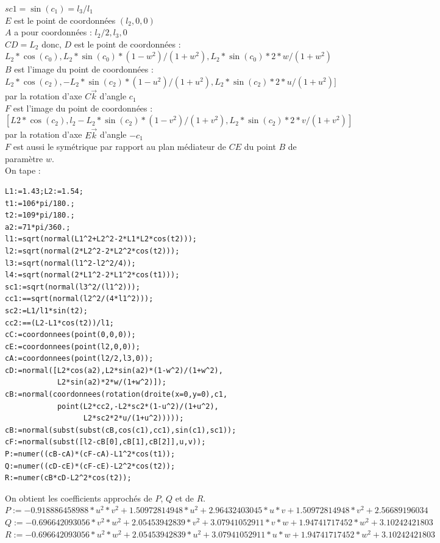 \documentclass[a4paper,11pt]{book}
\begin{document}
$sc1=\sin(c_1)=l_3/l_1$\\
$E$ est le point de coordonn\'ees $(l_2,0,0)$\\ 
$A$ a pour coordonn\'ees : $l_2/2,l_3,0$\\
$CD=L_2$ donc, $D$  est le point de coordonn\'ees :\\
$L_2*\cos(c_0),L_2*\sin(c_0)*(1-w^2)/(1+w^2),L_2*\sin(c_0)*2*w/(1+w^2)$\\
$B$ est l'image du point de coordonn\'ees :\\
$L_2*\cos(c_2),-L_2*\sin(c_2)*(1-u^2)/(1+u^2),L_2*\sin(c_2)*2*u/(1+u^2)]$ \\
par la rotation d'axe $C\overrightarrow{k}$ d'angle $c_1$\\
$F$ est l'image du point de coordonn\'ees :\\
$[L2*\cos(c_2),l_2-L_2*\sin(c_2)*(1-v^2)/(1+v^2),L_2*\sin(c_2)*2*v/(1+v^2)]$\\
 par la rotation d'axe $E\overrightarrow{k}$ d'angle $-c_1$\\
$F$ est aussi le sym\'etrique par rapport au plan m\'ediateur de $CE$
du point $B$ de param\`etre $w$.\\ 
On tape :
\begin{verbatim}
L1:=1.43;L2:=1.54;
t1:=106*pi/180.;
t2:=109*pi/180.;
a2:=71*pi/360.;
l1:=sqrt(normal(L1^2+L2^2-2*L1*L2*cos(t2)));
l2:=sqrt(normal(2*L2^2-2*L2^2*cos(t2)));
l3:=sqrt(normal(l1^2-l2^2/4));
l4:=sqrt(normal(2*L1^2-2*L1^2*cos(t1)));
sc1:=sqrt(normal(l3^2/(l1^2)));
cc1:==sqrt(normal(l2^2/(4*l1^2)));
sc2:=L1/l1*sin(t2);
cc2:==(L2-L1*cos(t2))/l1;
cC:=coordonnees(point(0,0,0));
cE:=coordonnees(point(l2,0,0));
cA:=coordonnees(point(l2/2,l3,0));
cD:=normal([L2*cos(a2),L2*sin(a2)*(1-w^2)/(1+w^2),
            L2*sin(a2)*2*w/(1+w^2)]);
cB:=normal(coordonnees(rotation(droite(x=0,y=0),c1,
            point(L2*cc2,-L2*sc2*(1-u^2)/(1+u^2),
                  L2*sc2*2*u/(1+u^2)))));
cB:=normal(subst(subst(cB,cos(c1),cc1),sin(c1),sc1));
cF:=normal(subst([l2-cB[0],cB[1],cB[2]],u,v));
P:=numer((cB-cA)*(cF-cA)-L1^2*cos(t1));
Q:=numer((cD-cE)*(cF-cE)-L2^2*cos(t2));
R:=numer(cB*cD-L2^2*cos(t2));
\end{verbatim}
On obtient les coefficients approch\'es de $P$, $Q$ et de $R$.\\ 
$P:=-0.918886458988*u^2*v^2+1.50972814948*u^2+2.96432403045*u*v+1.50972814948*v^2+2.56689196034$\\
$Q:=-0.696642093056*v^2*w^2+2.05453942839*v^2+3.07941052911*v*w+1.94741717452*w^2+3.10242421803$\\
$R:=-0.696642093056*u^2*w^2+2.05453942839*u^2+3.07941052911*u*w+1.94741717452*w^2+3.10242421803$\\
\end{document}
